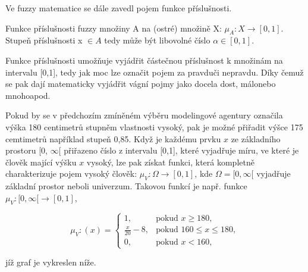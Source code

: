     Ve fuzzy matematice se dále zavedl pojem funkce příslušnosti.
    \begin{definition}
        \cite{Kolo} Funkce příslušnosti fuzzy množiny A na (ostré) množině X: $\mu_A : X \rightarrow  [0,1].$ Stupe\v n příslušnosti x $\in A$ tedy m\r uže být libovolné číslo $\alpha \in [0,1]$.
    \end{definition}
    Funkce příslušnosti umož\v nuje vyjádřit částečnou příslušnost k množinám na intervalu [0,1], tedy jak moc lze označit pojem za \clqq pravdu\crqq \space či \clqq nepravdu\crqq. Díky čemuž se pak dají matematicky vyjádřit vágní pojmy jako \clqq docela dost\crqq, \clqq málo\crqq \space nebo \clqq mnoho\crqq \space apod.

     Pokud by se v předchozím zmíněném výběru modelingové agentury označila výška 180 centimetr\r u stupněm vlastnosti \clqq vysoký\crqq {}, pak je možné přiřadit výšce 175 cemtimetr\r u například stupe\v n 0,85. Když je každému prvku $x$ ze základního prostoru [0, $\infty$[ přiřazeno číslo z intervalu [0,1], které vyjadřuje míru, ve které je člověk mající výšku $x$ vysoký, lze pak získat funkci, která kompletně charakterizuje pojem vysoký člověk: $\mu_V: \Omega \rightarrow [0,1]$, kde $\Omega = [0, \infty[$ vyjadřuje základní prostor neboli univerzum. Takovou funkcí je např. funkce $\mu_V:  [0, \infty[ \rightarrow [0,1]$, 

    $$\mu_V:(x)=\begin{cases} 1, & \mbox{pokud }  x \geq 180,\\ 
    \frac{x}{20} - 8, & \mbox{pokud } 160 \leq x \leq 180,\\
    0, & \mbox{pokud } x < 160,  \end{cases}$$

    jíž graf je vykreslen níže.

